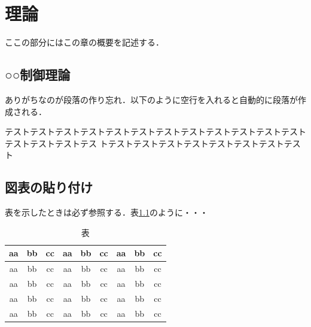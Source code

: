 ﻿%
\chapter{理論}
ここの部分にはこの章の概要を記述する．

\section{○○制御理論}

ありがちなのが段落の作り忘れ．以下のように空行を入れると自動的に段落が作成される．

テストテストテストテストテストテストテストテストテストテストテストテストテストテストテストテス
トテストテストテストテストテストテストテストテスト



\section{図表の貼り付け}
表を示したときは必ず参照する．表\ref{t1}のように・・・
\begin{table}[htbp]
\caption{表}
\label{t1}
\begin{center}
  \begin{tabular}[tb]{|c|c|c|c|c|c|c|c|c|}
   \hline
  aa & bb& cc & aa & bb& cc & aa & bb& cc \\ \hline
  aa & bb& cc & aa & bb& cc & aa & bb& cc \\ \hline
  aa & bb& cc & aa & bb& cc & aa & bb& cc \\ \hline
  aa & bb& cc & aa & bb& cc & aa & bb& cc  \\ \hline
  aa & bb& cc & aa & bb& cc & aa & bb& cc \\ \hline
 \end{tabular}
\end{center}
\end{table}

